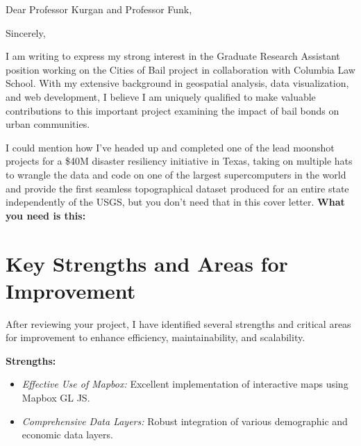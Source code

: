 \documentclass[letterpaper,10pt,colorlinks,linkcolor=cyan]{moderncv}
\begin{document}
  \hypersetup{urlcolor=links}
  \makecvtitle
  \date{May 15, 2024}
  \opening{Dear Professor Kurgan and Professor Funk,}
  \closing{Sincerely,}
  \makelettertitle
%
I am writing to express my strong interest in the Graduate Research Assistant position working on the Cities of Bail project in collaboration with Columbia Law School. With my extensive background in geospatial analysis, data visualization, and web development, I believe I am uniquely qualified to make valuable contributions to this important project examining the impact of bail bonds on urban communities.

I could mention how I've headed up and completed one of the lead moonshot projects for a \$40M disaster resiliency initiative in Texas, taking on multiple hats to wrangle the data and code on one of the largest supercomputers in the world and provide the first seamless topographical dataset produced for an entire state independently of the USGS, but you don't need that in this cover letter. \textbf{What you need is this:}

\section*{Key Strengths and Areas for Improvement}
After reviewing your project, I have identified several strengths and critical areas for improvement to enhance efficiency, maintainability, and scalability.

\textbf{Strengths:}
\begin{itemize}
	\item \textit{Effective Use of Mapbox:} Excellent implementation of interactive maps using Mapbox GL JS.
	\item \textit{Comprehensive Data Layers:} Robust integration of various demographic and economic data layers.
\end{itemize}
\end{document}
